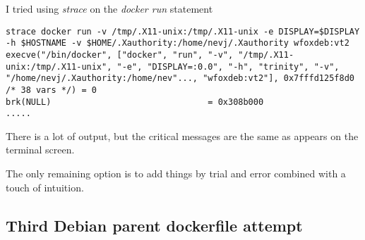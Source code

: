 \documentclass{article}  %
\begin{document}
I tried using {\em strace} on the {\em docker run} statement
\begin{verbatim}
strace docker run -v /tmp/.X11-unix:/tmp/.X11-unix -e DISPLAY=$DISPLAY -h $HOSTNAME -v $HOME/.Xauthority:/home/nevj/.Xauthority wfoxdeb:vt2
execve("/bin/docker", ["docker", "run", "-v", "/tmp/.X11-unix:/tmp/.X11-unix", "-e", "DISPLAY=:0.0", "-h", "trinity", "-v", "/home/nevj/.Xauthority:/home/nev"..., "wfoxdeb:vt2"], 0x7fffd125f8d0 /* 38 vars */) = 0
brk(NULL)                               = 0x308b000
.....
\end{verbatim}
There is  a lot of output,  but the critical messages are the same as appears on the terminal screen.

The only remaining option is to add things by trial and error combined with a touch of intuition.

\subsection{Third Debian parent dockerfile attempt}
\end{document}
